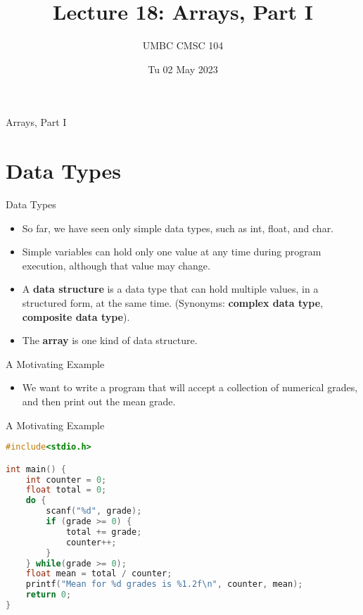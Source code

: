 \documentclass[graphics]{beamer}
\title{Lecture 18: Arrays, Part I}
\author{UMBC CMSC 104}
\date{Tu 02 May 2023}
\begin{document}
\begin{frame}{}
\centering
    Arrays, Part I
\end{frame}

\frame{\tableofcontents}

\section{Data Types}
\begin{frame}{Data Types}
    \begin{itemize}
        \item So far, we have seen only simple data types, such as int, float, and char.
        \item Simple variables can hold only one value at any time during program execution, although that value may change.
        \item A \textbf{data structure} is a data type that can hold multiple values, in a structured form, at the same time.  (Synonyms:  \textbf{complex data type}, \textbf{composite data type}).
        \item The \textbf{array} is one kind of data structure.
    \end{itemize}
\end{frame}

\begin{frame}{A Motivating Example}
    \begin{itemize}
        \item We want to write a program that will accept a collection of numerical grades, and then print out the mean grade.
    \end{itemize}
\end{frame}

\begin{frame}[fragile]{A Motivating Example}
    \begin{lstlisting}[language=C,basicstyle=\footnotesize,keywordstyle=\color{blue},commentstyle=\color{green},showstringspaces=false,stringstyle=\color{red}]
#include<stdio.h>

int main() {
    int counter = 0;
    float total = 0;
    do {
        scanf("%d", grade);
        if (grade >= 0) {
            total += grade;
            counter++;
        }
    } while(grade >= 0);
    float mean = total / counter;
    printf("Mean for %d grades is %1.2f\n", counter, mean);
    return 0;
}
    \end{lstlisting}
\end{frame}
\end{document}
